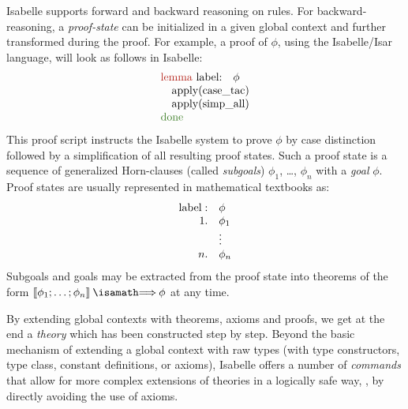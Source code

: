 Isabelle supports forward and backward reasoning on rules. For
backward-reasoning, a \emph{proof-state} can be initialized in a given 
global context and further transformed during the proof. For example,
a proof of $\phi$, using the
Isabelle/Isar~\cite{wenzel:isabelleisar:2002} language, will look as
follows in Isabelle:
\begin{gather*}
  \begin{array}{l}
    \Lemma{label} \phi\\
    \quad\apply{case\_tac}\\
    \quad\apply{simp\_all}\\
  \done
  \end{array}
\end{gather*}
This proof script instructs the Isabelle system to prove
$\phi$ by case distinction followed by a simplification of all
resulting proof states. Such a proof state is a
sequence of generalized Horn-clauses (called \emph{subgoals})
$\phi_1$, \ldots, $\phi_n$ with a \emph{goal} $\phi$. Proof states are
usually represented in mathematical textbooks as:
\begin{gather*}
\begin{array}{rl}
\text{label}:& \phi \\
 1.& \phi_1 \\
    &\vdots \\
 n.& \phi_n\\
\end{array}
\end{gather*}
Subgoals and goals may be extracted from the proof state into theorems
of the form $\semantics{\phi_1 ; \ldots; \phi_n} \ap\Implies\ap \phi$
at any time.

By extending global contexts with theorems, axioms and proofs, we get
at the end a \emph{theory} which has been constructed step by
step. Beyond the basic mechanism of extending a global context with
raw types (with type constructors, type class, constant definitions,
or axioms), Isabelle offers a number of \emph{commands} that allow for
more complex extensions of theories in a logically safe way, \ie, by
directly avoiding the use of axioms.

